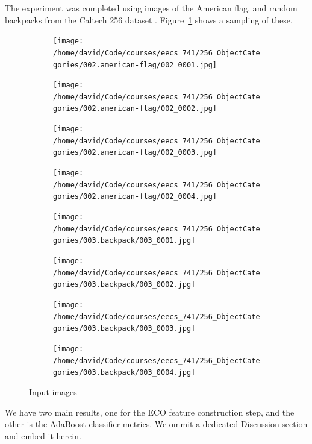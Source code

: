 \documentclass[conference]{IEEEtran}
\begin{document}
The experiment was completed using images of the American flag, and random backpacks from the Caltech 256 dataset \cite{griffin2007caltech}. Figure~\ref{fig:images} shows a sampling of these.
\begin{figure}[t]
  \centering
  \begin{subfigure}{.2\textwidth}
    \centering
    \texttt{[image: /home/david/Code/courses/eecs\_741/256\_ObjectCategories/002.american-flag/002\_0001.jpg]}
  \end{subfigure}
  \begin{subfigure}{.2\textwidth}
    \centering
    \texttt{[image: /home/david/Code/courses/eecs\_741/256\_ObjectCategories/002.american-flag/002\_0002.jpg]}
  \end{subfigure}
  \begin{subfigure}{.2\textwidth}
    \centering
    \texttt{[image: /home/david/Code/courses/eecs\_741/256\_ObjectCategories/002.american-flag/002\_0003.jpg]}
  \end{subfigure}
  \begin{subfigure}{.2\textwidth}
    \centering
    \texttt{[image: /home/david/Code/courses/eecs\_741/256\_ObjectCategories/002.american-flag/002\_0004.jpg]}
  \end{subfigure}
  \begin{subfigure}{.2\textwidth}
    \centering
    \texttt{[image: /home/david/Code/courses/eecs\_741/256\_ObjectCategories/003.backpack/003\_0001.jpg]}
  \end{subfigure}
  \begin{subfigure}{.2\textwidth}
    \centering
    \texttt{[image: /home/david/Code/courses/eecs\_741/256\_ObjectCategories/003.backpack/003\_0002.jpg]}
  \end{subfigure}
  \begin{subfigure}{.2\textwidth}
    \centering
    \texttt{[image: /home/david/Code/courses/eecs\_741/256\_ObjectCategories/003.backpack/003\_0003.jpg]}
  \end{subfigure}
  \begin{subfigure}{.2\textwidth}
    \centering
    \texttt{[image: /home/david/Code/courses/eecs\_741/256\_ObjectCategories/003.backpack/003\_0004.jpg]}
  \end{subfigure}
  \caption{Input images}
  \label{fig:images}
\end{figure}

We have two main results, one for the ECO feature construction step, and the other is the AdaBoost classifier metrics. We ommit a dedicated Discussion section and embed it herein.
\end{document}
